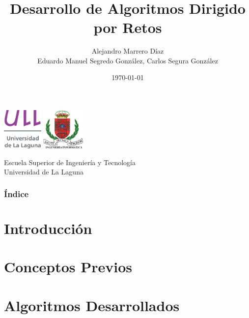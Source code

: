 \documentclass[12pt]{beamer}
\title[Desarrollo de Algoritmos Dirigido por Retos]{Desarrollo de Algoritmos Dirigido por Retos}
\author[Alejandro Marrero Díaz]{Alejandro Marrero Díaz\\[3mm]Eduardo Manuel Segredo González, Carlos Segura González}
\institute[ULL]{Universidad de La Laguna}
\date[]{\today}
\begin{document}
  
\begin{frame}

  \includegraphics[width=0.15\textwidth]{img/ullesc.eps}
  \hspace*{7.5cm}
  \includegraphics[width=0.16\textwidth]{img/etsii.eps}
  \titlepage

  \begin{scriptsize}
    \begin{center}
     Escuela Superior de Ingeniería y Tecnología \\
     Universidad de La Laguna
    \end{center}
  \end{scriptsize}

\end{frame}

\begin{frame}
  \frametitle{Índice}  
  \tableofcontents

\end{frame}

\section{Introducción}


\section{Conceptos Previos}


\section{Algoritmos Desarrollados}

\end{document}
